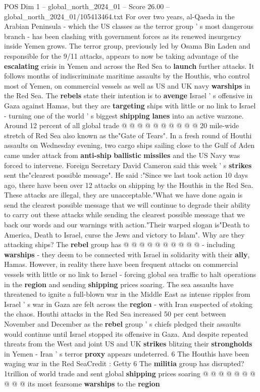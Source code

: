 \begin{textsample}{POS Dim 1 – global\_north\_2024\_01 – Score 26.00 – global\_north\_2024\_01/105413464.txt}
For over two years, al-Qaeda in the Arabian Peninsula - which the US classes as the terror group ' s most dangerous branch - has been clashing with government forces as its renewed insurgency inside Yemen grows.
The terror group, previously led by Osama Bin Laden and responsible for the 9/11 attacks, appears to now be taking advantage of the \textbf{escalating} crisis in Yemen and across the Red Sea to \textbf{launch} further attacks.
It follows months of indiscriminate maritime assaults by the Houthis, who control most of Yemen, on commercial vessels as well as US and UK navy \textbf{warships} in the Red Sea.
The \textbf{rebels} state their intention is to \textbf{avenge} Israel ' s offensive in Gaza against Hamas, but they are \textbf{targeting} ships with little or no link to Israel - turning one of the world ' s biggest \textbf{shipping} \textbf{lanes} into an active warzone.
Around 12 percent of all global trade @ @ @ @ @ @ @ @ @ @ 20 mile-wide stretch of Red Sea also known as the"Gate of Tears".
In a fresh round of Houthi assaults on Wednesday evening, two cargo ships sailing close to the Gulf of Aden came under attack from \textbf{anti-ship} \textbf{ballistic} \textbf{missiles} and the US Navy was forced to intervene.
Foreign Secretary David Cameron said this week ' s \textbf{strikes} sent the"clearest possible message".
He said :"Since we last took action 10 days ago, there have been over 12 attacks on shipping by the Houthis in the Red Sea.
These attacks are illegal, they are unacceptable."What we have done again is send the clearest possible message that we will continue to degrade their ability to carry out these attacks while sending the clearest possible message that we back our words and our warnings with action."Their warped slogan is"Death to America, Death to Israel, curse the Jews and victory to Islam".
Why are they attacking ships?
The \textbf{rebel} group has @ @ @ @ @ @ @ @ @ @ - including \textbf{warships} - they deem to be connected with Israel in solidarity with their \textbf{ally}, Hamas.
However, in reality there have been frequent attacks on commercial vessels with little or no link to Israel - forcing global sea traffic to halt operations in the \textbf{region} and sending \textbf{shipping} prices soaring.
The sea assaults have threatened to ignite a full-blown war in the Middle East as intense ripples from Israel ' s war in Gaza are felt across the \textbf{region} - with Iran suspected of stoking the chaos.
Houthi attacks in the Red Sea increased 50 per cent between November and December as the \textbf{rebel} group ' s chiefs pledged their assaults would continue until Israel stopped its offensive in Gaza.
And despite repeated threats from the West and joint US and UK \textbf{strikes} blitzing their \textbf{strongholds} in Yemen - Iran ' s terror \textbf{proxy} appears undeterred. 6 The Houthis have been waging war in the Red SeaCredit : Getty 6 The \textbf{militia} group has disrupted? 1trillion of world trade and sent global \textbf{shipping} prices soaring @ @ @ @ @ @ @ @ @ @ its most fearsome \textbf{warships} to the \textbf{region}


\end{textsample}
